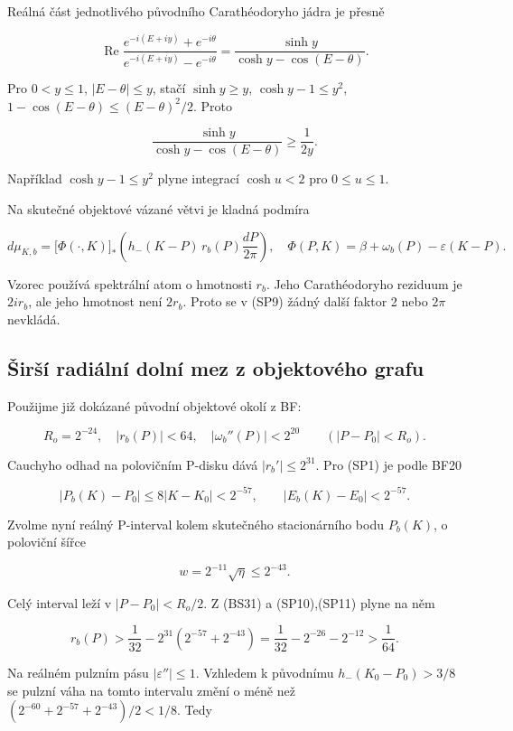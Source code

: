 \documentclass[11pt,a4paper]{article}
\theoremstyle{remark}\newtheorem{remark}[theorem]{Poznámka}
\numberwithin{equation}{section}
\begin{document}
Reálná část jednotlivého původního Carathéodoryho jádra je přesně

\[
\operatorname{Re}
\frac{e^{-i(E+i y)}+e^{-i\theta}}
{e^{-i(E+i y)}-e^{-i\theta}}
=\frac{\sinh y}{\cosh y-\cos(E-\theta)}.
\tag{SP7}
\]

Pro \(0<y\le1\), \(|E-\theta|\le y\), stačí \(\sinh y\ge y\),
\(\cosh y-1\le y^2\), \(1-\cos(E-\theta)\le(E-\theta)^2/2\). Proto

\[
\frac{\sinh y}{\cosh y-\cos(E-\theta)}\ge\frac1{2y}.
\tag{SP8}
\]

Například \(\cosh y-1\le y^2\) plyne integrací \(\cosh u<2\) pro
\(0\le u\le1\).

Na skutečné objektové vázané větvi je kladná podmíra

\[
d\mu_{K,b}
=\bigl[\Phi(\cdot,K)\bigr]_*
\left(h_-(K-P)\,r_b(P)\frac{dP}{2\pi}\right),
\quad
\Phi(P,K)=\beta+\omega_b(P)-\varepsilon(K-P).
\tag{SP9}
\]

Vzorec používá spektrální atom o hmotnosti \(r_b\). Jeho Carathéodoryho
reziduum je \(2ir_b\), ale jeho hmotnost není \(2r_b\). Proto se v (SP9)
žádný další faktor 2 nebo \(2\pi\) nevkládá.

\hypertarget{ux161irux161uxed-radiuxe1lnuxed-dolnuxed-mez-z-objektovuxe9ho-grafu}{%
\subsection{Širší radiální dolní mez z objektového
grafu}\label{ux161irux161uxed-radiuxe1lnuxed-dolnuxed-mez-z-objektovuxe9ho-grafu}}

Použijme již dokázané původní objektové okolí z BF:

\[
R_o=2^{-24},\quad |r_b(P)|<64,\quad
|\omega_b''(P)|<2^{20}
\qquad (|P-P_0|<R_o).
\tag{SP10}
\]

Cauchyho odhad na polovičním P-disku dává \(|r_b'|\le2^{31}\). Pro (SP1)
je podle BF20

\[
|P_b(K)-P_0|\le8|K-K_0|<2^{-57},\qquad
|E_b(K)-E_0|<2^{-57}.
\tag{SP11}
\]

Zvolme nyní reálný P-interval kolem skutečného stacionárního bodu
\(P_b(K)\), o poloviční šířce

\[
w=2^{-11}\sqrt\eta\le2^{-43}.
\tag{SP12}
\]

Celý interval leží v \(|P-P_0|<R_o/2\). Z (BS31) a (SP10),(SP11) plyne
na něm

\[
r_b(P)>\frac1{32}-2^{31}(2^{-57}+2^{-43})
=\frac1{32}-2^{-26}-2^{-12}>\frac1{64}.
\]

Na reálném pulzním pásu \(|\varepsilon''|\le1\). Vzhledem k původnímu
\(h_-(K_0-P_0)>3/8\) se pulzní váha na tomto intervalu změní o méně než
\((2^{-60}+2^{-57}+2^{-43})/2<1/8\). Tedy
\end{document}
